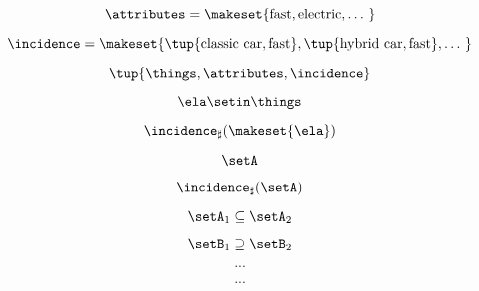 \begin{forslides}
     \begin{equation}
        \label{eq:slides_adjunctions_11}
       \attributes = \makeset{\text{fast}, \text{electric}, \dots \ }
    \end{equation}
    
     \begin{equation}
        \label{eq:slides_adjunctions_12}
       \incidence = \makeset{\tup{\text{classic car}, \text{fast}}, \tup{\text{hybrid car}, \text{fast}}, \dots \ }
    \end{equation}
    
     \begin{equation}
        \label{eq:slides_adjunctions_13}
      \tup{\things, \attributes, \incidence}
    \end{equation}
    
     \begin{equation}
        \label{eq:slides_adjunctions_14}
      \ela \setin \things
    \end{equation}
    
     \begin{equation}
        \label{eq:slides_adjunctions_15}
       \incidence_\sharp(\makeset{\ela})
    \end{equation}
    
     \begin{equation}
        \label{eq:slides_adjunctions_16}
     \setA
    \end{equation}
    
     \begin{equation}
        \label{eq:slides_adjunctions_17}
     \incidence_\sharp(\setA)
    \end{equation}
    
    \begin{equation}
        \setA_1 \subseteq \setA_2
    \end{equation}
    
     \begin{equation}
        \label{eq:slides_adjunctions_19}
       \setB_1 \supseteq \setB_2
    \end{equation}
    
     \begin{equation}
        \label{eq:slides_adjunctions_20}
       ...
    \end{equation}
    
     \begin{equation}
        \label{eq:slides_adjunctions_21}
      ...
    \end{equation}
    

\end{forslides}
